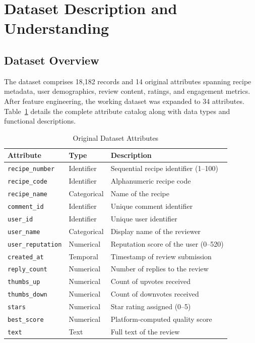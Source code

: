 \documentclass[12pt,a4paper]{article}
\begin{document}
\section{Dataset Description and Understanding}

\subsection{Dataset Overview}

The dataset comprises 18{,}182 records and 14 original attributes spanning recipe metadata, user demographics, review content, ratings, and engagement metrics. After feature engineering, the working dataset was expanded to 34 attributes. Table~\ref{tab:attributes} details the complete attribute catalog along with data types and functional descriptions.

\begin{table}[H]
\centering
\caption{Original Dataset Attributes}
\label{tab:attributes}
\small
\begin{tabularx}{\textwidth}{l l X}
\toprule
\textbf{Attribute} & \textbf{Type} & \textbf{Description} \\
\midrule
\texttt{recipe\_number} & Identifier & Sequential recipe identifier (1--100) \\
\texttt{recipe\_code}   & Identifier & Alphanumeric recipe code \\
\texttt{recipe\_name}   & Categorical & Name of the recipe \\
\texttt{comment\_id}    & Identifier & Unique comment identifier \\
\texttt{user\_id}       & Identifier & Unique user identifier \\
\texttt{user\_name}     & Categorical & Display name of the reviewer \\
\texttt{user\_reputation}& Numerical  & Reputation score of the user (0--520) \\
\texttt{created\_at}    & Temporal    & Timestamp of review submission \\
\texttt{reply\_count}   & Numerical   & Number of replies to the review \\
\texttt{thumbs\_up}     & Numerical   & Count of upvotes received \\
\texttt{thumbs\_down}   & Numerical   & Count of downvotes received \\
\texttt{stars}          & Numerical   & Star rating assigned (0--5) \\
\texttt{best\_score}    & Numerical   & Platform-computed quality score \\
\texttt{text}           & Text        & Full text of the review \\
\bottomrule
\end{tabularx}
\end{table}
\end{document}

